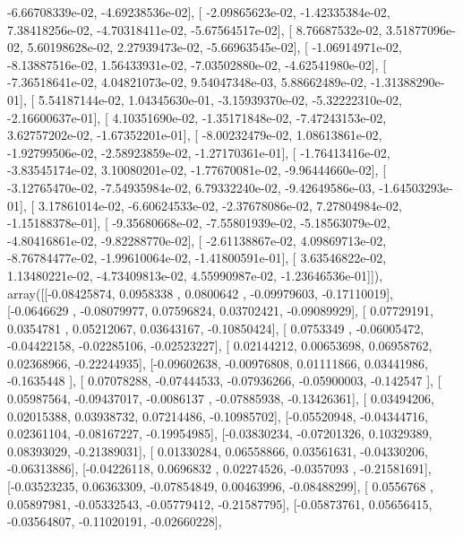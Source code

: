 \documentclass{article}
\begin{document}
         -6.66708339e-02,  -4.69238536e-02],
       [ -2.09865623e-02,  -1.42335384e-02,   7.38418256e-02,
         -4.70318411e-02,  -5.67564517e-02],
       [  8.76687532e-02,   3.51877096e-02,   5.60198628e-02,
          2.27939473e-02,  -5.66963545e-02],
       [ -1.06914971e-02,  -8.13887516e-02,   1.56433931e-02,
         -7.03502880e-02,  -4.62541980e-02],
       [ -7.36518641e-02,   4.04821073e-02,   9.54047348e-03,
          5.88662489e-02,  -1.31388290e-01],
       [  5.54187144e-02,   1.04345630e-01,  -3.15939370e-02,
         -5.32222310e-02,  -2.16600637e-01],
       [  4.10351690e-02,  -1.35171848e-02,  -7.47243153e-02,
          3.62757202e-02,  -1.67352201e-01],
       [ -8.00232479e-02,   1.08613861e-02,  -1.92799506e-02,
         -2.58923859e-02,  -1.27170361e-01],
       [ -1.76413416e-02,  -3.83545174e-02,   3.10080201e-02,
         -1.77670081e-02,  -9.96444660e-02],
       [ -3.12765470e-02,  -7.54935984e-02,   6.79332240e-02,
         -9.42649586e-03,  -1.64503293e-01],
       [  3.17861014e-02,  -6.60624533e-02,  -2.37678086e-02,
          7.27804984e-02,  -1.15188378e-01],
       [ -9.35680668e-02,  -7.55801939e-02,  -5.18563079e-02,
         -4.80416861e-02,  -9.82288770e-02],
       [ -2.61138867e-02,   4.09869713e-02,  -8.76784477e-02,
         -1.99610064e-02,  -1.41800591e-01],
       [  3.63546822e-02,   1.13480221e-02,  -4.73409813e-02,
          4.55990987e-02,  -1.23646536e-01]]), array([[-0.08425874,  0.0958338 ,  0.0800642 , -0.09979603, -0.17110019],
       [-0.0646629 , -0.08079977,  0.07596824,  0.03702421, -0.09089929],
       [ 0.07729191,  0.0354781 ,  0.05212067,  0.03643167, -0.10850424],
       [ 0.0753349 , -0.06005472, -0.04422158, -0.02285106, -0.02523227],
       [ 0.02144212,  0.00653698,  0.06958762,  0.02368966, -0.22244935],
       [-0.09602638, -0.00976808,  0.01111866,  0.03441986, -0.1635448 ],
       [ 0.07078288, -0.07444533, -0.07936266, -0.05900003, -0.142547  ],
       [ 0.05987564, -0.09437017, -0.0086137 , -0.07885938, -0.13426361],
       [ 0.03494206,  0.02015388,  0.03938732,  0.07214486, -0.10985702],
       [-0.05520948, -0.04344716,  0.02361104, -0.08167227, -0.19954985],
       [-0.03830234, -0.07201326,  0.10329389,  0.08393029, -0.21389031],
       [ 0.01330284,  0.06558866,  0.03561631, -0.04330206, -0.06313886],
       [-0.04226118,  0.0696832 ,  0.02274526, -0.0357093 , -0.21581691],
       [-0.03523235,  0.06363309, -0.07854849,  0.00463996, -0.08488299],
       [ 0.0556768 ,  0.05897981, -0.05332543, -0.05779412, -0.21587795],
       [-0.05873761,  0.05656415, -0.03564807, -0.11020191, -0.02660228],
\end{document}
